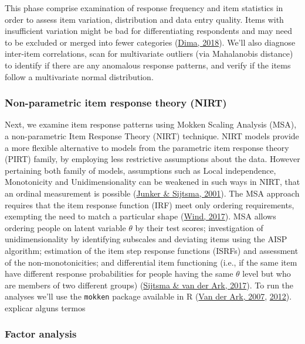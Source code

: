 \documentclass[
  ,doc,11pt, twoside,floatsintext]{apa6}
\begin{document}
This phase comprise examination of response frequency and item statistics in order to assess item variation, distribution and data entry quality. Items with insufficient variation might be bad for differentiating respondents and may need to be excluded or merged into fewer categories (\protect\hyperlink{ref-dima2018}{Dima, 2018}). We'll also diagnose inter-item correlations, scan for multivariate outliers (via Mahalanobis distance) to identify if there are any anomalous response patterns, and verify if the items follow a multivariate normal distribution.

\hypertarget{non-parametric-item-response-theory-nirt}{%
\subsubsection{Non-parametric item response theory (NIRT)}\label{non-parametric-item-response-theory-nirt}}

Next, we examine item response patterns using Mokken Scaling Analysis (MSA), a non-parametric Item Response Theory (NIRT) technique. NIRT models provide a more flexible alternative to models from the parametric item response theory (PIRT) family, by employing less restrictive assumptions about the data. However pertaining both family of models, assumptions such as Local independence, Monotonicity and Unidimensionality can be weakened in such ways in NIRT, that an ordinal measurement is possible (\protect\hyperlink{ref-junker2001}{Junker \& Sijtsma, 2001}). The MSA approach requires that the item response function (IRF) meet only ordering requirements, exempting the need to match a particular shape (\protect\hyperlink{ref-wind2017}{Wind, 2017}). MSA allows ordering people on latent variable \(\theta\) by their test scores; investigation of unidimensionality by identifying subscales and deviating items using the AISP algorithm; estimation of the item step response functions (ISRFs) and assessment of the non-monotonicities; and differential item functioning (i.e., if the same item have different response probabilities for people having the same \(\theta\) level but who are members of two different groups) (\protect\hyperlink{ref-sijtsma2017}{Sijtsma \& van der Ark, 2017}). To run the analyses we'll use the \texttt{mokken} package available in R (\protect\hyperlink{ref-ark2007}{Van der Ark, 2007}, \protect\hyperlink{ref-ark2012}{2012}). explicar alguns termos

\hypertarget{factor-analysis}{%
\subsubsection{Factor analysis}\label{factor-analysis}}
\end{document}
